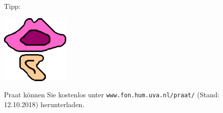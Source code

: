Tipp: \newline \\ 

\begin {minipage} {0.1\textwidth}
\includegraphics[width=\textwidth]{grafiken/sprachaufnahme/praat.png}
\end{minipage}
\hspace {1cm}
\begin{minipage} {0.7\textwidth}
Praat können Sie kostenlos unter {\tt www.fon.hum.uva.nl/praat/} (Stand: 12.10.2018) herunterladen. 
\end {minipage}


